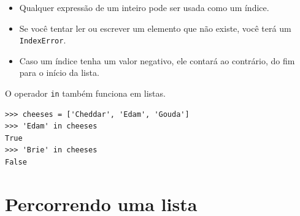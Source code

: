 \begin{itemize}

\item Qualquer expressão de um inteiro pode ser usada como um índice.

\item Se você tentar ler ou escrever um elemento que não existe, você
terá um {\tt IndexError}.


\item Caso um índice tenha um valor negativo, ele contará ao contrário,
do fim para o início da lista.

\end{itemize}



O operador {\tt in} também funciona em listas.

\beforeverb
\begin{verbatim}
>>> cheeses = ['Cheddar', 'Edam', 'Gouda']
>>> 'Edam' in cheeses
True
>>> 'Brie' in cheeses
False
\end{verbatim}
\afterverb

\section{Percorrendo uma lista}

